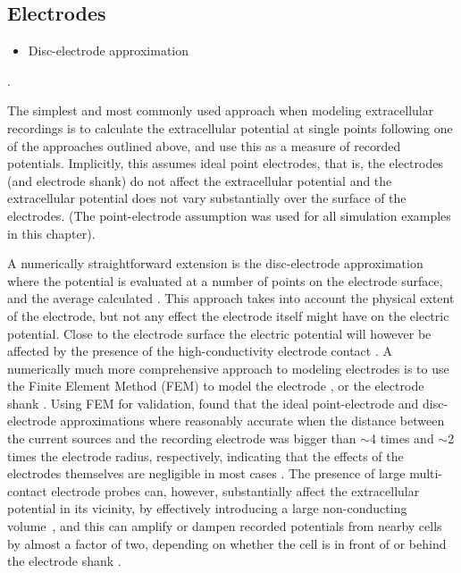 \subsection{Electrodes}
\label{sec:electrode}
\begin{itemize}
\item Disc-electrode approximation
\end{itemize}
. 

The simplest and most commonly used approach when modeling extracellular recordings is to calculate the extracellular potential at single points following one of the approaches outlined above, and use this as a measure of recorded potentials. Implicitly, this assumes ideal point electrodes, that is, the electrodes (and electrode shank) do not affect the extracellular potential and the extracellular potential does not vary substantially over the surface of the electrodes. (The point-electrode assumption was used for all simulation examples in this chapter).

A numerically straightforward extension is the disc-electrode approximation where the potential is evaluated at a number of points on the electrode surface, and the average calculated \citep{ Linden2014}. 
This approach takes into account the physical extent of the electrode, but not any effect the electrode itself might have on the electric potential. 
Close to the electrode surface the electric potential will however be affected by the presence of the high-conductivity electrode contact \citep{McIntyre2001, Moulin2008}. A numerically much more comprehensive approach to modeling electrodes is to use the Finite Element Method (FEM) to model the electrode \citep{Moulin2008, Ness2015}, or the electrode shank \citep{Moffitt2005, Buccino2019b}. Using FEM for validation, \cite{Ness2015} found that the ideal point-electrode and disc-electrode approximations where reasonably accurate when the distance between the current sources and the recording electrode was bigger than $\sim$4 times and $\sim$2 times the electrode radius, respectively, indicating that the effects of the electrodes themselves are negligible in most cases \citep{Nelson2010}.
The presence of large multi-contact electrode probes can, however, substantially affect the extracellular potential in its vicinity, by effectively introducing a large non-conducting volume~\citep{Mechler2012}, and this can amplify or dampen recorded potentials from nearby cells by almost a factor of two, depending on whether the cell is in front of or behind the electrode shank \citep{Buccino2019b}.

